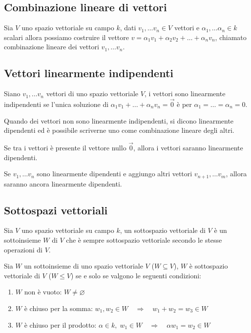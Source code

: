 \documentclass[a4paper]{article}
\begin{document}
\subsection{Combinazione lineare di vettori}
Sia \(V\) uno spazio vettoriale su campo \(k\), dati \(v_1, \dots v_n \in V\) vettori e \(\alpha_1, \dots \alpha_n \in k\) scalari
allora possiamo costruire il vettore \(v = \alpha_1 v_1 + \alpha_2 v_2 + \dots + \alpha_n v_n\), chiamato combinazione lineare dei
vettori \(v_1, \dots v_n\).

\subsection{Vettori linearmente indipendenti}
Siano \(v_1, \dots v_n\) vettori di uno spazio vettoriale \(V\), i vettori sono linearmente indipendenti se l'unica soluzione di
\(\alpha_1 v_1 + \dots + \alpha_n v_n = \vec{0}\) è per \(\alpha_1 = \dots = \alpha_n = 0\).

Quando dei vettori non sono linearmente indipendenti, si dicono linearmente dipendenti ed è possibile scriverne uno come combinazione
lineare degli altri.

Se tra i vettori è presente il vettore nullo \(\vec{0}\), allora i vettori saranno linearmente dipendenti.

Se \(v_1, \dots v_n\) sono linearmente dipendenti e aggiungo altri vettori \(v_{n+1}, \dots v_m\), allora saranno ancora linearmente
dipendenti.

\subsection{Sottospazi vettoriali}
Sia \(V\) uno spazio vettoriale su campo \(k\), un sottospazio vettoriale di \(V\) è un sottoinsieme \(W\) di \(V\) che è sempre
sottospazio vettoriale secondo le stesse operazioni di \(V\).

Sia \(W\) un sottoinsieme di uno spazio vettoriale \(V\) (\(W \subseteq V\)), \(W\) è sottospazio vettoriale di \(V\) (\(W \leq V\))
se e solo se valgono le seguenti condizioni:
\begin{enumerate}[topsep=3pt, itemsep=0pt]
	\item \(W\) non è vuoto: \(W \neq \varnothing\)
	\item \(W\) è chiuso per la somma: \(w_1, w_2 \in W \quad \Rightarrow \quad w_1 + w_2 = w_3 \in W\)
	\item \(W\) è chiuso per il prodotto: \(\alpha \in k, \; w_1 \in W \quad \Rightarrow \quad \alpha w_1 = w_2 \in W\)
\end{enumerate}
\end{document}
